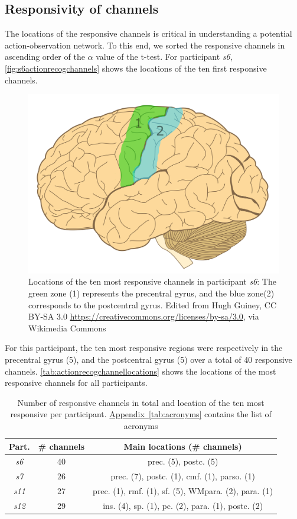 \documentclass[10pt,conference,compsocconf]{IEEEtran}
\newcommand{\aref}[1]{\hyperref[#1]{Appendix~\ref*{#1}}}
\begin{document}
\subsection{Responsivity of channels}
The locations of the responsive channels is critical in understanding a potential action-observation network. To this end, we sorted the responsive channels in ascending order of the \(\alpha\) value of the t-test. For participant \textit{s6}, \autoref{fig:s6actionrecogchannels} shows the locations of the ten first responsive channels.

\begin{figure}[h!]
    \center
    \includegraphics[width=0.8\linewidth]{images/Human-brain.png}
    \caption{Locations of the ten most responsive channels in participant \textit{s6}: The green zone (1) represents the precentral gyrus, and the blue zone(2) corresponds to the postcentral gyrus. Edited from Hugh Guiney, CC BY-SA 3.0 \url{https://creativecommons.org/licenses/by-sa/3.0}, via Wikimedia Commons}
    \label{fig:s6actionrecogchannels}
\end{figure}
\FloatBarrier

For this participant, the ten most responsive regions were respectively in the precentral gyrus (5), and the postcentral gyrus (5) over a total of 40 responsive channels. \autoref{tab:actionrecogchannellocations} shows the locations of the most responsive channels for all participants.

\begin{table}[h!]
    \centering
    \begin{tabular}{| c | c | c |}
        \hline
        Part. & \# channels & Main locations (\# channels) \\
        \hline
        \textit{s6} & 40 & prec. (5), postc. (5) \\
        \hline
        \textit{s7} & 26 & prec. (7), postc. (1), cmf. (1), parso. (1) \\
        \hline
        \textit{s11} & 27 & prec. (1),  rmf. (1), sf. (5), WMpara. (2), para. (1) \\
        \hline
        \textit{s12} & 29 & ins. (4), sp. (1), pc. (2), para. (1), postc. (2) \\
        \hline
    \end{tabular}
    \caption{Number of responsive channels in total and location of the ten most responsive per participant. \aref{tab:acronyms} contains the list of acronyms}
    \label{tab:actionrecogchannellocations}
\end{table}
\end{document}
